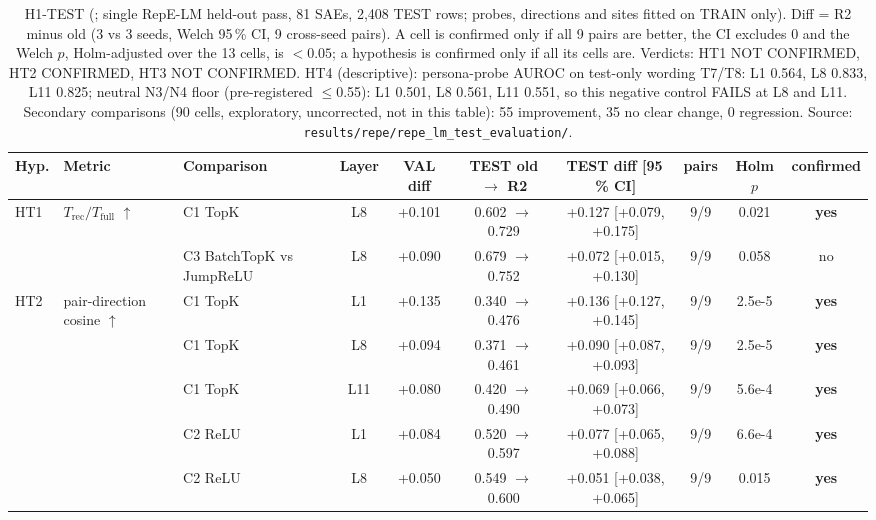 \begin{table}[t]
\centering
\small
\caption{H1-TEST (; single RepE-LM held-out pass, 81 SAEs, 2,408 TEST rows; probes, directions and sites fitted on TRAIN only). Diff = R2 minus old (3 vs 3 seeds, Welch 95\,\% CI, 9 cross-seed pairs). A cell is confirmed only if all 9 pairs are better, the CI excludes 0 and the Welch $p$, Holm-adjusted over the 13 cells, is $<0.05$; a hypothesis is confirmed only if all its cells are. Verdicts: HT1 NOT CONFIRMED, HT2 CONFIRMED, HT3 NOT CONFIRMED. HT4 (descriptive): persona-probe AUROC on test-only wording T7/T8: L1 0.564, L8 0.833, L11 0.825; neutral N3/N4 floor (pre-registered $\le$0.55): L1 0.501, L8 0.561, L11 0.551, so this negative control FAILS at L8 and L11. Secondary comparisons (90 cells, exploratory, uncorrected, not in this table): 55 improvement, 35 no clear change, 0 regression. Source: \texttt{results/\allowbreak{}repe/\allowbreak{}repe\_lm\_test\_evaluation/}.}
\label{tab:h1test}
\begin{adjustbox}{max width=\linewidth}
\begin{tabular}{lllccccccc}
\toprule
Hyp. & Metric & Comparison & Layer & VAL diff & TEST old $\rightarrow$ R2 & TEST diff [95\,\% CI] & pairs & Holm $p$ & confirmed \\
\midrule
HT1 & $T_{\text{rec}}/T_{\text{full}}$ $\uparrow$ & C1 TopK & L8 & +0.101 & 0.602 $\rightarrow$ 0.729 & +0.127 [+0.079, +0.175] & 9/9 & 0.021 & \textbf{yes} \\
 &  & C3 BatchTopK vs JumpReLU & L8 & +0.090 & 0.679 $\rightarrow$ 0.752 & +0.072 [+0.015, +0.130] & 9/9 & 0.058 & no \\
HT2 & pair-direction cosine $\uparrow$ & C1 TopK & L1 & +0.135 & 0.340 $\rightarrow$ 0.476 & +0.136 [+0.127, +0.145] & 9/9 & 2.5e-5 & \textbf{yes} \\
 &  & C1 TopK & L8 & +0.094 & 0.371 $\rightarrow$ 0.461 & +0.090 [+0.087, +0.093] & 9/9 & 2.5e-5 & \textbf{yes} \\
 &  & C1 TopK & L11 & +0.080 & 0.420 $\rightarrow$ 0.490 & +0.069 [+0.066, +0.073] & 9/9 & 5.6e-4 & \textbf{yes} \\
 &  & C2 ReLU & L1 & +0.084 & 0.520 $\rightarrow$ 0.597 & +0.077 [+0.065, +0.088] & 9/9 & 6.6e-4 & \textbf{yes} \\
 &  & C2 ReLU & L8 & +0.050 & 0.549 $\rightarrow$ 0.600 & +0.051 [+0.038, +0.065] & 9/9 & 0.015 & \textbf{yes} \\

\end{tabular}
\end{adjustbox}
\end{table}

